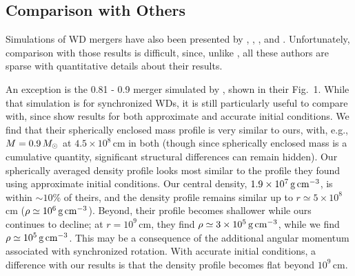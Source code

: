 \subsection{Comparison with Others}
\label{ssec:c2_compwithothers}

Simulations of WD mergers have also been presented by \citet{yoonpr07}, \citet{pakm+10,pakm+11,pakm+12}, \citet{dan+11,dan+12}, and \citet{rask+12}.  Unfortunately, comparison with those results is difficult, since, unlike \citeal{loreig09}, all these authors are sparse with quantitative details about their results.


An exception is the 0.81 - 0.9 {\Msun} merger simulated by \cite{dan+12}, shown in their Fig.~1.  While that simulation is for synchronized WDs, it is still particularly useful to compare with, since \citeauthor{dan+12} show results for both approximate and accurate initial conditions.  We find that their spherically enclosed mass profile is very similar to ours, with, e.g., $M=0.9\,\Msun$ at $4.5\times10^8\,$cm in both (though since spherically enclosed mass is a cumulative quantity, significant structural differences can remain hidden).  Our spherically averaged density profile looks most similar to the profile they found using approximate initial conditions.  Our central density, $1.9\times10^7\,\gcc$, is within $\sim\!10$\% of theirs, and the density profile remains similar up to $r \simeq 5 \times 10^8\,$cm ($\rho\simeq10^6\,\gcc$).  Beyond, their profile becomes shallower while ours continues to decline; at $r=10^9\,$cm, they find $\rho\simeq3\times10^5\,\gcc$, while we find $\rho\simeq10^5\,\gcc$.  This may be a consequence of the additional angular momentum associated with synchronized rotation.  With accurate initial conditions, a difference with our results is that the density profile becomes flat beyond $10^9\,$cm.  


